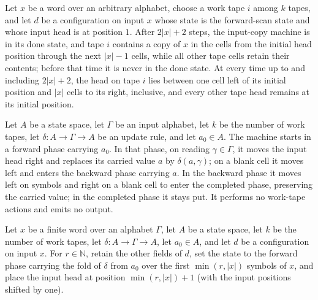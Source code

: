 \begin{theorem}
\label{Turing.inputCopyTM_run_ofCfg}
\leanok
{}
Let $x$ be a word over an arbitrary alphabet, choose a work tape $i$ among $k$ tapes,
and let $d$ be a configuration on input $x$ whose state is the forward-scan state and
whose input head is at position $1$. After $2|x|+2$ steps, the input-copy machine is in
its done state, and tape $i$ contains a copy of $x$ in the cells from the initial head
position through the next $|x|-1$ cells, while all other tape cells retain their
contents; before that time it is never in the done state. At every time up to and
including $2|x|+2$, the head on tape $i$ lies between one cell left of its initial
position and $|x|$ cells to its right, inclusive, and every other tape head remains at
its initial position.
\end{theorem}

\begin{definition}
\label{Turing.inputFoldTM}
\leanok
{}
Let $A$ be a state space, let $\Gamma$ be an input alphabet, let $k$ be the number of
work tapes, let $\delta:A\to\Gamma\to A$ be an update rule, and let $a_0\in A$. The
machine starts in a forward phase carrying $a_0$. In that phase, on reading
$\gamma\in\Gamma$, it moves the input head right and replaces its carried value $a$ by
$\delta(a,\gamma)$; on a blank cell it moves left and enters the backward phase carrying
$a$. In the backward phase it moves left on symbols and right on a blank cell to enter
the completed phase, preserving the carried value; in the completed phase it stays put.
It performs no work-tape actions and emits no output.
\end{definition}

\begin{definition}
\label{Turing.scanFoldF}
\leanok
{}
Let $x$ be a finite word over an alphabet $\Gamma$, let $A$ be a state space, let $k$ be
the number of work tapes, let $\delta:A\to\Gamma\to A$, let $a_0\in A$, and let $d$ be a
configuration on input $x$. For $r\in\mathbb{N}$, retain the other fields of $d$, set
the state to the forward phase carrying the fold of $\delta$ from $a_0$ over the first
$\min(r,|x|)$ symbols of $x$, and place the input head at position $\min(r,|x|)+1$ (with
the input positions shifted by one).
\end{definition}

